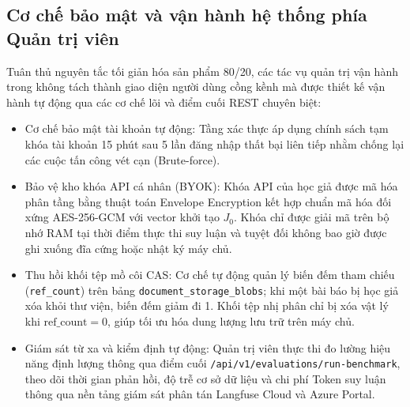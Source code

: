 \subsection{Cơ chế bảo mật và vận hành hệ thống phía Quản trị viên}
\label{subsec:uc_admin}

Tuân thủ nguyên tắc tối giản hóa sản phẩm 80/20, các tác vụ quản trị vận hành trong \VS không tách thành giao diện người dùng cồng kềnh mà được thiết kế vận hành tự động qua các cơ chế lõi và điểm cuối REST chuyên biệt:
\begin{itemize}[noitemsep, topsep=2pt]
    \item Cơ chế bảo mật tài khoản tự động: Tầng xác thực áp dụng chính sách tạm khóa tài khoản 15 phút sau 5 lần đăng nhập thất bại liên tiếp nhằm chống lại các cuộc tấn công vét cạn (Brute-force).
    \item Bảo vệ kho khóa API cá nhân (BYOK): Khóa API của học giả được mã hóa phân tầng bằng thuật toán Envelope Encryption kết hợp chuẩn mã hóa đối xứng AES-256-GCM với vector khởi tạo $J_0$. Khóa chỉ được giải mã trên bộ nhớ RAM tại thời điểm thực thi suy luận và tuyệt đối không bao giờ được ghi xuống đĩa cứng hoặc nhật ký máy chủ.
    \item Thu hồi khối tệp mồ côi CAS: Cơ chế tự động quản lý biến đếm tham chiếu (\texttt{ref\_count}) trên bảng \texttt{document\_storage\_blobs}; khi một bài báo bị học giả xóa khỏi thư viện, biến đếm giảm đi 1. Khối tệp nhị phân chỉ bị xóa vật lý khi $\text{ref\_count} = 0$, giúp tối ưu hóa dung lượng lưu trữ trên máy chủ.
    \item Giám sát từ xa và kiểm định tự động: Quản trị viên thực thi đo lường hiệu năng định lượng thông qua điểm cuối \texttt{/api/v1/evaluations/run-benchmark}, theo dõi thời gian phản hồi, độ trễ cơ sở dữ liệu và chi phí Token suy luận thông qua nền tảng giám sát phân tán Langfuse Cloud và Azure Portal.
\end{itemize}


